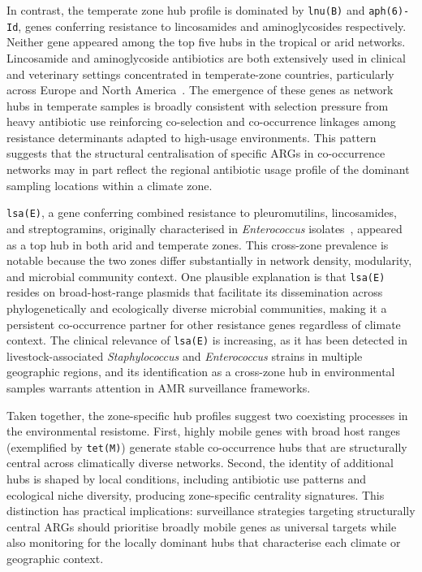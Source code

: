 \documentclass[12pt,a4paper]{article}
\begin{document}
In contrast, the temperate zone hub profile is dominated by
\texttt{lnu(B)} and \texttt{aph(6)-Id}, genes conferring resistance
to lincosamides and aminoglycosides respectively.
Neither gene appeared among the top five hubs in the tropical or arid
networks.
Lincosamide and aminoglycoside antibiotics are both extensively used in
clinical and veterinary settings concentrated in temperate-zone countries,
particularly across Europe and North America~\cite{vanBoeckel2014}.
The emergence of these genes as network hubs in temperate samples is
broadly consistent with selection pressure from heavy antibiotic use
reinforcing co-selection and co-occurrence linkages among resistance
determinants adapted to high-usage environments.
This pattern suggests that the structural centralisation of specific
ARGs in co-occurrence networks may in part reflect the regional
antibiotic usage profile of the dominant sampling locations within
a climate zone.

\texttt{lsa(E)}, a gene conferring combined resistance to
pleuromutilins, lincosamides, and streptogramins, originally
characterised in \emph{Enterococcus} isolates~\cite{Lozano2012},
appeared as a top hub in both arid and temperate zones.
This cross-zone prevalence is notable because the two zones differ
substantially in network density, modularity, and microbial community
context.
One plausible explanation is that \texttt{lsa(E)} resides on
broad-host-range plasmids that facilitate its dissemination across
phylogenetically and ecologically diverse microbial communities,
making it a persistent co-occurrence partner for other resistance genes
regardless of climate context.
The clinical relevance of \texttt{lsa(E)} is increasing, as it has been
detected in livestock-associated \emph{Staphylococcus} and
\emph{Enterococcus} strains in multiple geographic regions, and its
identification as a cross-zone hub in environmental samples warrants
attention in AMR surveillance frameworks.

Taken together, the zone-specific hub profiles suggest two
coexisting processes in the environmental resistome.
First, highly mobile genes with broad host ranges (exemplified by
\texttt{tet(M)}) generate stable co-occurrence hubs that are
structurally central across climatically diverse networks.
Second, the identity of additional hubs is shaped by local conditions,
including antibiotic use patterns and ecological niche diversity,
producing zone-specific centrality signatures.
This distinction has practical implications: surveillance strategies
targeting structurally central ARGs should prioritise broadly mobile
genes as universal targets while also monitoring for the locally
dominant hubs that characterise each climate or geographic context.
\end{document}
